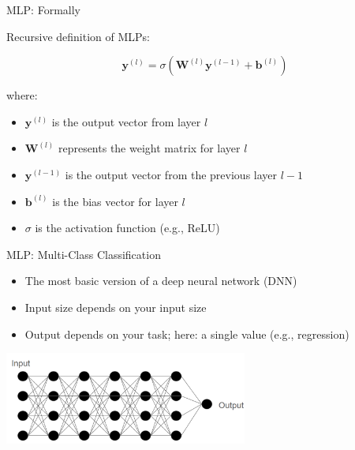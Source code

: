 \documentclass[aspectratio=169]{../latex_main/tntbeamer}  %
\begin{document}
 	\begin{frame}{MLP: Formally}

        Recursive definition of MLPs:

            \[
            \textbf{y}^{(l)} = \sigma(\textbf{W}^{(l)} \textbf{y}^{(l-1)} + \textbf{b}^{(l)})
            \]
            
            where:
            \begin{itemize}
                \item \( \textbf{y}^{(l)} \) is the output vector from layer \( l \)
                \item \( \textbf{W}^{(l)} \) represents the weight matrix for layer \( l \)
                \item \( \textbf{y}^{(l-1)} \) is the output vector from the previous layer \( l-1 \)
                \item \( \textbf{b}^{(l)} \) is the bias vector for layer \( l \)
                \item \( \sigma \) is the activation function (e.g., ReLU)
            \end{itemize}
	\end{frame}

  	\begin{frame}{MLP: Multi-Class Classification}

        \begin{itemize}
            \item The most basic version of a deep neural network (DNN)
            \item Input size depends on your input size
            \item Output depends on your task; here: a single value (e.g., regression)
        \end{itemize}

        \centering
        \includegraphics[width=0.6\textwidth]{figures/mlp1.png}
                
	\end{frame}
\end{document}
